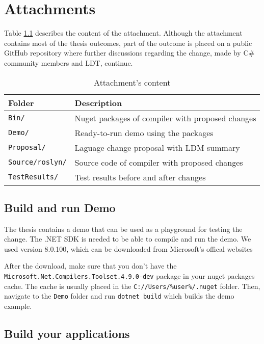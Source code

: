 \chapter{Attachments}

Table \ref{img80:attachment} describes the content of the attachment. 
Although the attachment contains most of the thesis outcomes, part of the outcome is placed on a public GitHub repository where further discussions regarding the change, made by C\# community members and LDT, continue.
\begin{table}[h]
\centering
\begin{tabular}{ | m{11em} | m{22em}| } 
\hline
Folder & Description \\
\hline
\texttt{Bin/} & Nuget packages of compiler with proposed changes \\
\texttt{Demo/} & Ready-to-run demo using the packages \\
\texttt{Proposal/} & Laguage change proposal with LDM summary \\
\texttt{Source/roslyn/} & Source code of compiler with proposed changes \\
\texttt{TestResults/} & Test results before and after changes \\
\hline
\end{tabular}
\caption{Attachment's content }
\label{img80:attachment}
\end{table}

\section{Build and run Demo}

The thesis contains a demo that can be used as a playground for testing the change. 
The .NET SDK is needed to be able to compile and run the demo. We used version 8.0.100, which can be downloaded from Microsoft's offical websites
\par
After the download, make sure that you don't have the\\ \texttt{Microsoft.Net.Compilers.Toolset.4.9.0-dev} package in your nuget packages cache.
The cache is usually placed in the \texttt{C://Users/\%user\%/.nuget} folder.
Then, navigate to the \texttt{Demo} folder and run \texttt{dotnet build} which builds the demo example.

\section{Build your applications}

